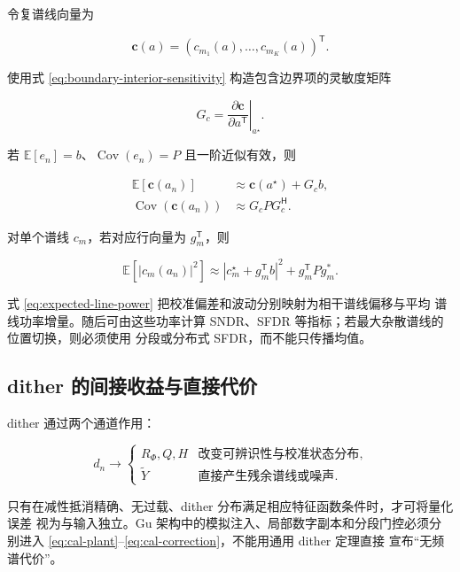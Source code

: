 \documentclass[11pt,a4paper]{ctexart}
\newcommand{\E}{\mathbb{E}}
\newcommand{\Cov}{\operatorname{Cov}}
\theoremstyle{adcplain}
\theoremstyle{definition}
\begin{document}
令复谱线向量为

\begin{equation}
  \bm c(a)
  =
  (c_{m_1}(a),\ldots,c_{m_K}(a))^\mathsf T.
\end{equation}

使用式 \eqref{eq:boundary-interior-sensitivity} 构造包含边界项的灵敏度矩阵

\begin{equation}
  G_c
  =
  \left.
  \frac{\partial\bm c}{\partial a^\mathsf T}
  \right|_{a^\star}.
\end{equation}

若 $\E[e_n]=b$、$\Cov(e_n)=P$ 且一阶近似有效，则

\begin{align}
  \E[\bm c(a_n)]
  &\approx
  \bm c(a^\star)+G_cb, \label{eq:spectral-mean}\\
  \Cov(\bm c(a_n))
  &\approx
  G_cPG_c^\mathsf H. \label{eq:spectral-cov}
\end{align}

对单个谱线 $c_m$，若对应行向量为 $g_m^\mathsf T$，则

\begin{equation}
  \E[|c_m(a_n)|^2]
  \approx
  |c_m^\star+g_m^\mathsf Tb|^2
  +g_m^\mathsf T P g_m^\ast.
  \label{eq:expected-line-power}
\end{equation}

式 \eqref{eq:expected-line-power} 把校准偏差和波动分别映射为相干谱线偏移与平均
谱线功率增量。随后可由这些功率计算 SNDR、SFDR 等指标；若最大杂散谱线的位置切换，则必须使用
分段或分布式 SFDR，而不能只传播均值。

\subsection{dither 的间接收益与直接代价}

dither 通过两个通道作用：

\begin{equation}
  d_n
  \longrightarrow
  \begin{cases}
    R_\Phi,Q,H & \text{改变可辨识性与校准状态分布},\\
    \widetilde Y & \text{直接产生残余谱线或噪声}.
  \end{cases}
  \label{eq:dither-two-paths}
\end{equation}

只有在减性抵消精确、无过载、dither 分布满足相应特征函数条件时，才可将量化误差
视为与输入独立。Gu 架构中的模拟注入、局部数字副本和分段门控必须分别进入
\eqref{eq:cal-plant}--\eqref{eq:cal-correction}，不能用通用 dither 定理直接
宣布“无频谱代价”。
\end{document}
